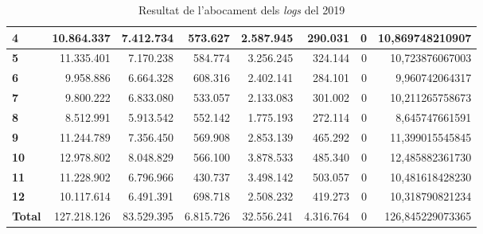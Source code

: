 \begin{table}[h!]
\begin{adjustbox}{width=1.5\textwidth, center}
\begin{tabular}{|l|r|r|r|r|r|r|r|}
            \textbf{4}     & 10.864.337  & 7.412.734  & 573.627   & 2.587.945  & 290.031   & 0 & 10,869748210907  \\
            \midrule
            \textbf{5}     & 11.335.401  & 7.170.238  & 584.774   & 3.256.245  & 324.144   & 0 & 10,723876067003  \\
            \textbf{6}     & 9.958.886   & 6.664.328  & 608.316   & 2.402.141  & 284.101   & 0 & 9,960742064317   \\
            \textbf{7}     & 9.800.222   & 6.833.080  & 533.057   & 2.133.083  & 301.002   & 0 & 10,211265758673  \\
            \textbf{8}     & 8.512.991   & 5.913.542  & 552.142   & 1.775.193  & 272.114   & 0 & 8,645747661591   \\
            \midrule
            \textbf{9}     & 11.244.789  & 7.356.450  & 569.908   & 2.853.139  & 465.292   & 0 & 11,399015545845  \\
            \textbf{10}    & 12.978.802  & 8.048.829  & 566.100   & 3.878.533  & 485.340   & 0 & 12,485882361730  \\
            \textbf{11}    & 11.228.902  & 6.796.966  & 430.737   & 3.498.142  & 503.057   & 0 & 10,481618428230  \\
            \textbf{12}    & 10.117.614  & 6.491.391  & 698.718   & 2.508.232  & 419.273   & 0 & 10,318790821234  \\
            \midrule
            \textbf{Total} & 127.218.126 & 83.529.395 & 6.815.726 & 32.556.241 & 4.316.764 & 0 & 126,845229073365 \\
            \bottomrule
        \end{tabular}
    \end{adjustbox}
    \caption{Resultat de l'abocament dels \textit{logs} del 2019}
    \label{tab:logs-table-2019}
\end{table}
